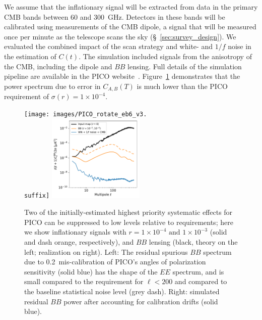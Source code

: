\documentclass[PICOReport.tex]{subfiles}
\begin{document}
We assume that the inflationary signal will be extracted from data in the primary CMB bands between 60 and 300~GHz.  Detectors in these bands will be calibrated using measurements of the CMB dipole, a signal that will be measured once per minute as the telescope scans the sky (\S~\ref{sec:survey_design}).  We evaluated the combined impact of the scan strategy and white- and $1/f$ noise in the estimation of $C(t)$.
The simulation included signals from the anisotropy of the CMB, including the dipole and $BB$ lensing. Full details of the simulation pipeline are available in the PICO website~\citep{picoweb_dipole}. Figure~\ref{fig:rot_bb_tb_eb} demonstrates that the power spectrum due to error in $C_{A,B} (T)$ is much lower than the PICO requirement of $\sigma(r) = 1\times 10^{-4}$. 
\begin{figure}[thb]
\centerline{
\texttt{[image: images/PICO\_rotate\_eb6\_v3.\\suffix]} 
\hspace{0.3in}
\includegraphics[width=0.41\textwidth]{images/calibration_spectrum_BB.pdf} }
\vspace{-0.1in}
\caption{\captiontext
Two of the initially-estimated highest priority systematic effects for PICO can be suppressed to low levels relative to requirements; here we show inflationary signals with  $r = 1\times 10^{-4}\,\, \mbox{and} \,\, 1\times 10^{-3}$ (solid and dash orange, respectively), and $BB$ lensing (black, theory on the left; realization on right). Left: The residual spurious $BB$ spectrum due to 0.2\arcmin\ mis-calibration of PICO's angles of polarization sensitivity (solid blue) has the shape of the $EE$ spectrum, and is small compared to the requirement for $\ell<200$ and compared to the baseline statistical noise level (grey dash). Right: simulated residual $BB$ power after accounting for calibration drifts (solid blue). 
\label{fig:rot_bb_tb_eb} }
\vspace{-0.1in}
\end{figure}
\end{document}
